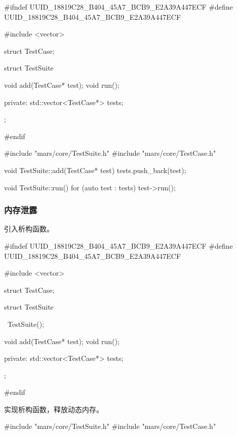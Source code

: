 \begin{content}
\begin{leftbar}
 \begin{c++}[caption={\ttfamily{include/mars/core/TestSuite.h}}]
#ifndef UUID_18819C28_B404_45A7_BCB9_E2A39A447ECF
#define UUID_18819C28_B404_45A7_BCB9_E2A39A447ECF

#include <vector>

struct TestCase;

struct TestSuite {
  void add(TestCase* test);
  void run();

private:
  std::vector<TestCase*> tests;
};

#endif
 \end{c++}
\end{leftbar}

\begin{leftbar}
 \begin{c++}[caption={\ttfamily{src/mars/core/TestSuite.cc}}]
#include "mars/core/TestSuite.h"
#include "mars/core/TestCase.h"

void TestSuite::add(TestCase* test) {
  tests.push_back(test);
}

void TestSuite::run() {
  for (auto test : tests) {
    test->run();
  }
}
 \end{c++}
\end{leftbar}

\subsubsection{内存泄露}

引入析构函数。

\begin{leftbar}
 \begin{c++}[caption={\ttfamily{include/mars/core/TestSuite.h}}]
#ifndef UUID_18819C28_B404_45A7_BCB9_E2A39A447ECF
#define UUID_18819C28_B404_45A7_BCB9_E2A39A447ECF

#include <vector>

struct TestCase;

struct TestSuite {
  ~TestSuite();

  void add(TestCase* test);
  void run();

private:
  std::vector<TestCase*> tests;
};

#endif
 \end{c++}
\end{leftbar}

实现析构函数，释放动态内存。

\begin{leftbar}
 \begin{c++}[caption={\ttfamily{src/mars/core/TestSuite.cc}}]
#include "mars/core/TestSuite.h"
#include "mars/core/TestCase.h"


\end{c++}
\end{leftbar}
\end{content}
